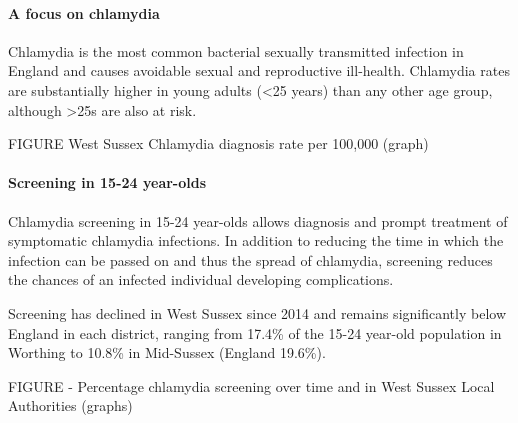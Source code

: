 \paragraph{A focus on chlamydia} Chlamydia is the most common bacterial sexually transmitted infection in England and causes avoidable sexual and reproductive ill-health. Chlamydia rates are substantially higher in young adults (<25 years) than any other age group, although >25s are also at risk.

FIGURE West Sussex Chlamydia diagnosis rate per 100,000 (graph)

\paragraph{Screening in 15-24 year-olds} Chlamydia screening in 15-24 year-olds allows diagnosis and prompt treatment of symptomatic chlamydia infections. In addition to reducing the time in which the infection can be passed on and thus the spread of chlamydia, screening reduces the chances of an infected individual developing complications.

Screening has declined in West Sussex since 2014 and remains significantly below England in each district, ranging from 17.4\% of the 15-24 year-old population in Worthing to 10.8\% in Mid-Sussex (England 19.6\%).

FIGURE - Percentage chlamydia screening over time and in West Sussex Local Authorities (graphs)


